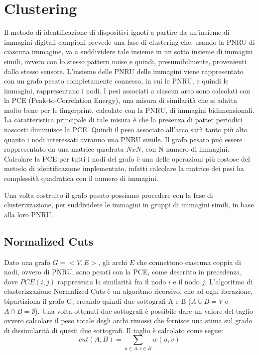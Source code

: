 \section{Clustering}

Il metodo di identificazione di dispositivi ignoti a partire da un'insieme di immagini digitali campioni prevede una fase di clustering che, usando la PNRU di ciascuna immagine, va a suddividere tale insieme in un sotto insieme di immagini simili, ovvero con lo stesso pattern noise e quindi, presumibilmente, provenienti dallo stesso sensore.
L'insieme delle PNRU delle immagini viene rappresentato con un grafo pesato completamente connesso, in cui le PNRU, e quindi le immagini, rappresentano i nodi. I pesi associati a ciascun arco sono calcolati con la PCE (Peak-to-Correlation Energy), una misura di similarità che si adatta molto bene per le fingerprint, calcolate con la PNRU, di immagini bidimensionali. La caratteristica principale di tale misura è che la presenza di patter periodici nascosti diminuisce la PCE. Quindi il peso associato all'arco sarà tanto più alto quanto i nodi interessati avranno una PNRU simile. Il grafo pesato può essere rappresentato da una matrice quadrata $NxN$, con N numero di immagini.
Calcolare la PCE per tutti i nodi del grafo è una delle operazioni più costose del metodo di identificazione implementato, infatti calcolare la matrice dei pesi ha complessità quadratica con il numero di immagini.

Una volta costruito il grafo pesato possiamo procedere con la fase di clusterizzazione, per suddividere le immagini in gruppi di immagini simili, in base alla loro PNRU.


\subsection{Normalized Cuts}

Dato una grafo $ G = <V, E> $, gli archi $E$ che connettono ciascuna coppia di nodi, ovvero di PNRU, sono pesati con la PCE, come descritto in precedenza, dove $PCE(i, j)$ rappresenta la similarità fra il nodo $i$ e il nodo $j$.
L'algoritmo di clusterizzazione Normalized Cuts è un algoritmo ricorsivo, che ad ogni iterazione, bipartiziona il grafo G, creando quindi due sottografi A e B ($A\cup B = V$ e $A\cap B = \emptyset$). Una volta ottenuti due sottografi è possibile dare un valore del taglio ovvero calcolare il peso totale  degli archi rimossi che fornisce una stima sul grado di dissimilarità di questi due sottografi. Il taglio è calcolato come segue: $$ cut(A,B) = \sum_{u\in A, v\in B} w(u, v) $$

